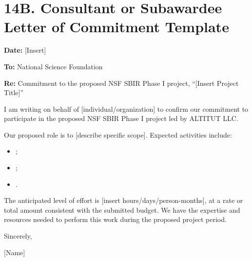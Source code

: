 \documentclass[11pt,letterpaper]{article}
\begin{document}
\section*{14B. Consultant or Subawardee Letter of Commitment Template}

\textbf{Date:} [Insert]

\textbf{To:} National Science Foundation

\textbf{Re:} Commitment to the proposed NSF SBIR Phase I project,
``[Insert Project Title]''

I am writing on behalf of [individual/organization] to confirm our commitment
to participate in the proposed NSF SBIR Phase I project led by ALTITUT LLC.

Our proposed role is to [describe specific scope]. Expected activities include:
\begin{itemize}
\item [Deliverable or activity];
\item [Deliverable or activity];
\item [Deliverable or activity].
\end{itemize}

The anticipated level of effort is [insert hours/days/person-months], at a rate
or total amount consistent with the submitted budget. We have the expertise and
resources needed to perform this work during the proposed project period.

Sincerely,

[Name] \\
[Title] \\
[Organization] \\
[Signature]
\end{document}
